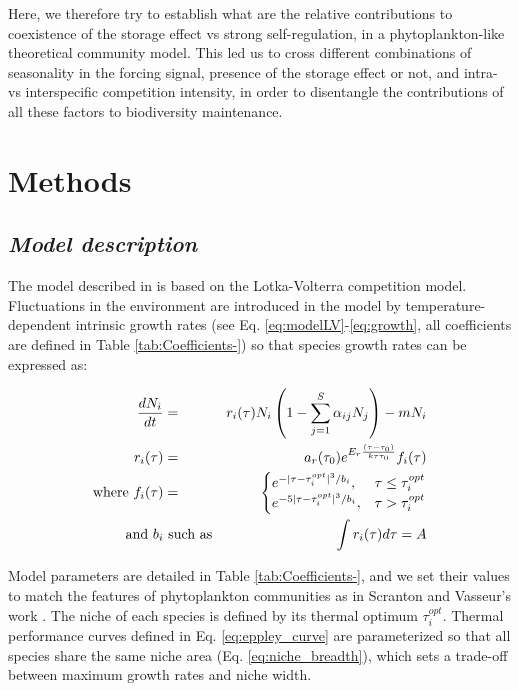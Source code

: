 \documentclass[smallcondensed,referee]{svjour3}       %
\begin{document}
Here, we therefore try to establish what are the relative contributions
to coexistence of the storage effect vs strong self-regulation, in
a phytoplankton-like theoretical community model. This led us to cross
different combinations of seasonality in the forcing signal, presence
of the storage effect or not, and intra- vs interspecific competition
intensity, in order to disentangle the contributions of all these
factors to biodiversity maintenance.
 
\section*{Methods}

\subsection*{\emph{Model description}}

The model described in \citet{scranton_coexistence_2016} is based
on the Lotka-Volterra competition model. Fluctuations in the environment
are introduced in the model by temperature-dependent intrinsic growth
rates (see Eq. \ref{eq:modelLV}-\ref{eq:growth}, all coefficients
are defined in Table \ref{tab:Coefficients-}) so that species growth
rates can be expressed as:

\begin{eqnarray}
\frac{dN_{i}}{dt} & = & r_{i}(\tau)N_{i}\left(1-\sum_{j=1}^{S}\alpha_{ij}N_{j}\right)-mN_{i}\label{eq:modelLV}\\
r_{i}(\tau) & = & a_{r}(\tau_{0})e^{E_{r}\frac{(\tau-\tau_{\text{0}})}{k\tau\tau_{0}}}f_{i}(\tau)\label{eq:growth}\\
\textnormal{where }f_{i}(\tau) & = & \begin{cases}
e^{-|\tau-\tau_{i}^{opt}|^{3}/b_{i}}, & \tau\leq\tau_{i}^{opt}\\
e^{-5|\tau-\tau_{i}^{opt}|^{3}/b_{i}}, & \tau>\tau_{i}^{opt}
\end{cases}\label{eq:eppley_curve}\\
\textnormal{and } b_{i}&\text{ such as} & \int r_{i}(\tau)d\tau=A\label{eq:niche_breadth}
\end{eqnarray}

Model parameters are detailed in Table \ref{tab:Coefficients-}, and
we set their values to match the features of phytoplankton communities
as in Scranton and Vasseur's work \citeyearpar{scranton_coexistence_2016}.
The niche of each species is defined by its thermal optimum $\tau_{i}^{opt}$.
Thermal performance curves defined in Eq. \ref{eq:eppley_curve} are
parameterized so that all species share the same niche area (Eq. \ref{eq:niche_breadth}),
which sets a trade-off between maximum growth rates and niche width. 
\end{document}
